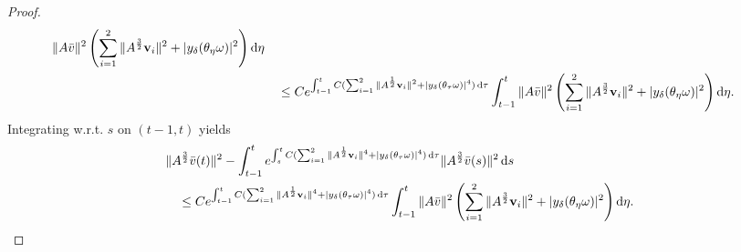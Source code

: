 \documentclass{elsarticle}
\theoremstyle{definition}
\numberwithin{equation}{section}
\renewcommand{\d}{{\rm{d}}}
\begin{document}
\begin{proof}
\begin{align*}
\|A\bar{v}\|^2 \left(\sum_{i=1}^2\|A^\frac32\textbf{v}_i\|^2+|y_\delta(\theta_\eta\omega)|^2\right) \d \eta\nonumber\\
&\quad \leq Ce^{\int_{t-1}^tC( \sum_{i=1}^2 \|A^\frac12\textbf{v}_i\|^2+|y_\delta(\theta_\tau\omega)|^4)\, \d \tau}
\int_{t-1}^t\|A\bar{v}\|^2\left(\sum_{i=1}^2\|A^\frac32\textbf{v}_i\|^2+|y_\delta(\theta_\eta\omega)|^2 \right) \d \eta. \nonumber
\end{align*}
Integrating w.r.t. $s$ on $(t-1,t)$ yields
\begin{align}\label{6.23}
&\|A^\frac32\bar{v}(t)\|^2
-\int_{t-1}^te^{\int_s^tC( \sum_{i=1}^2 \|A^\frac12\textbf{v}_i\|^4+|y_\delta(\theta_\tau\omega)|^4)\, \d \tau}\|A^\frac32\bar{v}(s)\|^2\, \d s\nonumber\\
&\quad \leq Ce^{\int_{t-1}^tC( \sum_{i=1}^2 \|A^\frac12\textbf{v}_i\|^4+|y_\delta(\theta_\tau\omega)|^4)\, \d \tau}
\int_{t-1}^t\|A\bar{v}\|^2\left (\sum_{i=1}^2\|A^\frac32\textbf{v}_i\|^2+|y_\delta(\theta_\eta\omega)|^2\right) \d \eta.
\end{align}


\end{proof}
\end{document}
